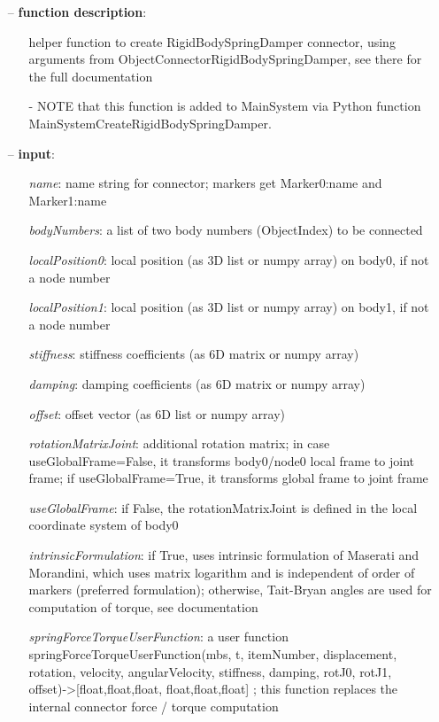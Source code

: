 \begin{itemize}[leftmargin=0.7cm]
\item[--]
{\bf function description}: \vspace{-6pt}
\begin{itemize}[leftmargin=1.2cm]
\setlength{\itemindent}{-0.7cm}
\item[]helper function to create RigidBodySpringDamper connector, using arguments from ObjectConnectorRigidBodySpringDamper, see there for the full documentation
\item[]- NOTE that this function is added to MainSystem via Python function MainSystemCreateRigidBodySpringDamper.
\end{itemize}
\item[--]
{\bf input}: \vspace{-6pt}
\begin{itemize}[leftmargin=1.2cm]
\setlength{\itemindent}{-0.7cm}
\item[]{\it name}: name string for connector; markers get Marker0:name and Marker1:name
\item[]{\it bodyNumbers}: a list of two body numbers (ObjectIndex) to be connected
\item[]{\it localPosition0}: local position (as 3D list or numpy array) on body0, if not a node number
\item[]{\it localPosition1}: local position (as 3D list or numpy array) on body1, if not a node number
\item[]{\it stiffness}: stiffness coefficients (as 6D matrix or numpy array)
\item[]{\it damping}: damping coefficients (as 6D matrix or numpy array)
\item[]{\it offset}: offset vector (as 6D list or numpy array)
\item[]{\it rotationMatrixJoint}: additional rotation matrix; in case  useGlobalFrame=False, it transforms body0/node0 local frame to joint frame; if useGlobalFrame=True, it transforms global frame to joint frame
\item[]{\it useGlobalFrame}: if False, the rotationMatrixJoint is defined in the local coordinate system of body0
\item[]{\it intrinsicFormulation}: if True, uses intrinsic formulation of Maserati and Morandini, which uses matrix logarithm and is independent of order of markers (preferred formulation); otherwise, Tait-Bryan angles are used for computation of torque, see documentation
\item[]{\it springForceTorqueUserFunction}: a user function springForceTorqueUserFunction(mbs, t, itemNumber, displacement, rotation, velocity, angularVelocity, stiffness, damping, rotJ0, rotJ1, offset)->[float,float,float, float,float,float] ; this function replaces the internal connector force / torque computation

\end{itemize}
\end{itemize}
